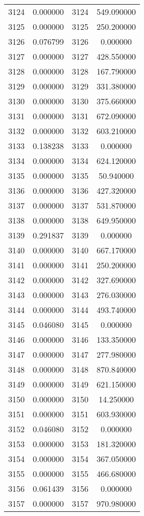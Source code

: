 \documentclass[12pt]{article}
\begin{document}
\begin{longtable}{@{}cccc@{}}
3124 & 0.000000 & 3124 & 549.090000 \\
3125 & 0.000000 & 3125 & 250.200000 \\
3126 & 0.076799 & 3126 & 0.000000 \\
3127 & 0.000000 & 3127 & 428.550000 \\
3128 & 0.000000 & 3128 & 167.790000 \\
3129 & 0.000000 & 3129 & 331.380000 \\
3130 & 0.000000 & 3130 & 375.660000 \\
3131 & 0.000000 & 3131 & 672.090000 \\
3132 & 0.000000 & 3132 & 603.210000 \\
3133 & 0.138238 & 3133 & 0.000000 \\
3134 & 0.000000 & 3134 & 624.120000 \\
3135 & 0.000000 & 3135 & 50.940000 \\
3136 & 0.000000 & 3136 & 427.320000 \\
3137 & 0.000000 & 3137 & 531.870000 \\
3138 & 0.000000 & 3138 & 649.950000 \\
3139 & 0.291837 & 3139 & 0.000000 \\
3140 & 0.000000 & 3140 & 667.170000 \\
3141 & 0.000000 & 3141 & 250.200000 \\
3142 & 0.000000 & 3142 & 327.690000 \\
3143 & 0.000000 & 3143 & 276.030000 \\
3144 & 0.000000 & 3144 & 493.740000 \\
3145 & 0.046080 & 3145 & 0.000000 \\
3146 & 0.000000 & 3146 & 133.350000 \\
3147 & 0.000000 & 3147 & 277.980000 \\
3148 & 0.000000 & 3148 & 870.840000 \\
3149 & 0.000000 & 3149 & 621.150000 \\
3150 & 0.000000 & 3150 & 14.250000 \\
3151 & 0.000000 & 3151 & 603.930000 \\
3152 & 0.046080 & 3152 & 0.000000 \\
3153 & 0.000000 & 3153 & 181.320000 \\
3154 & 0.000000 & 3154 & 367.050000 \\
3155 & 0.000000 & 3155 & 466.680000 \\
3156 & 0.061439 & 3156 & 0.000000 \\
3157 & 0.000000 & 3157 & 970.980000 \\

\end{longtable}
\end{document}
